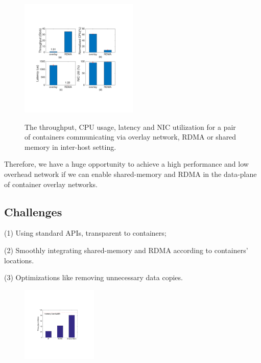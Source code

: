      \begin{figure}[ht]
     \centering 
     \includegraphics[width=0.5\textwidth]{figures/motivation/mot_rdma_inter.pdf}      
     \label{fig:mot_rdma_inter}
     \caption{The throughput, CPU usage, latency and NIC utilization for a pair of 
     containers communicating via overlay network, RDMA or shared memory in 
     inter-host setting.} 
     \end{figure}
     

Therefore, we have a huge opportunity to achieve a high performance
and low overhead network if we can enable shared-memory and RDMA 
in the data-plane of container overlay networks.

\subsection{Challenges}


(1) Using standard APIs, transparent to containers;


(2) Smoothly integrating shared-memory and RDMA according to containers' locations.

(3) Optimizations like removing unnecessary data copies.

\iffalse

     \begin{figure}[ht]
     \centering 
     \includegraphics[width=0.32\textwidth]{figures/motivation/eval_baremetal_thr.pdf}      
     \label{fig:eval_baremetal_thr}
     \caption{} 
     \end{figure}

